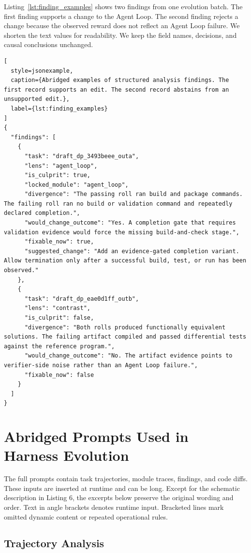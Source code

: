 \documentclass{article} %
\begin{document}
Listing~\ref{lst:finding_examples} shows two findings from one evolution
batch. The first finding supports a change to the Agent Loop. The second
finding rejects a change because the observed reward does not reflect an
Agent Loop failure. We shorten the text values for readability. We keep the
field names, decisions, and causal conclusions unchanged.

\begin{lstlisting}[
  style=jsonexample,
  caption={Abridged examples of structured analysis findings. The first record supports an edit. The second record abstains from an unsupported edit.},
  label={lst:finding_examples}
]
{
  "findings": [
    {
      "task": "draft_dp_3493beee_outa",
      "lens": "agent_loop",
      "is_culprit": true,
      "locked_module": "agent_loop",
      "divergence": "The passing roll ran build and package commands. The failing roll ran no build or validation command and repeatedly declared completion.",
      "would_change_outcome": "Yes. A completion gate that requires validation evidence would force the missing build-and-check stage.",
      "fixable_now": true,
      "suggested_change": "Add an evidence-gated completion variant. Allow termination only after a successful build, test, or run has been observed."
    },
    {
      "task": "draft_dp_eae0d1ff_outb",
      "lens": "contrast",
      "is_culprit": false,
      "divergence": "Both rolls produced functionally equivalent solutions. The failing artifact compiled and passed differential tests against the reference program.",
      "would_change_outcome": "No. The artifact evidence points to verifier-side noise rather than an Agent Loop failure.",
      "fixable_now": false
    }
  ]
}
\end{lstlisting}


\section{Abridged Prompts Used in Harness Evolution}
\label{appendix:prompts}

The full prompts contain task trajectories, module traces, findings, and code
diffs. These inputs are inserted at runtime and can be long. Except for the schematic description in Listing 6, the excerpts below preserve the original wording and order. Text in angle brackets denotes runtime
input. Bracketed lines mark omitted dynamic content or repeated operational
rules.

\subsection{Trajectory Analysis}
\label{appendix:Trajectory_analysis}
\end{document}
